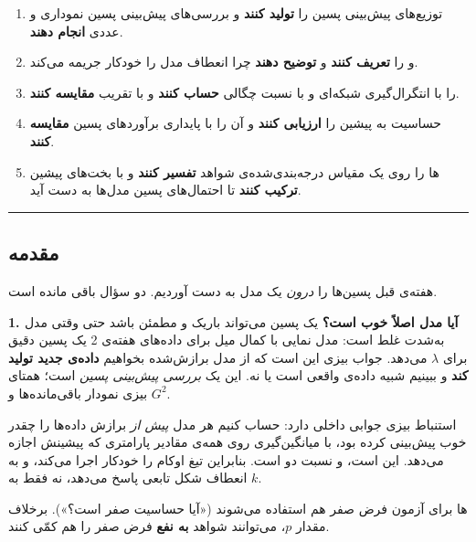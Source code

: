 \begin{enumerate}
\def\labelenumi{\arabic{enumi}.}
\tightlist
\item
  توزیع‌های پیش‌بینی پسین را \textbf{تولید کنند} و بررسی‌های پیش‌بینی پسین
   نموداری و عددی \textbf{انجام دهند}.
\item
   و  را \textbf{تعریف کنند} و
  \textbf{توضیح دهند} چرا  انعطاف مدل را خودکار
  جریمه می‌کند.
\item
   را با انتگرال‌گیری شبکه‌ای و با نسبت چگالی
   \textbf{حساب کنند} و با تقریب 
  \textbf{مقایسه کنند}.
\item
  حساسیت  به پیشین را \textbf{ارزیابی کنند} و آن را با
  پایداری برآوردهای پسین \textbf{مقایسه کنند}.
\item
  ها را روی یک مقیاس درجه‌بندی‌شده‌ی شواهد \textbf{تفسیر
  کنند} و با بخت‌های پیشین \textbf{ترکیب کنند} تا احتمال‌های پسین مدل‌ها به
  دست آید.
\end{enumerate}

\begin{center}\rule{0.5\linewidth}{0.5pt}\end{center}

\subsection{مقدمه}

هفته‌ی قبل پسین‌ها را \emph{درون} یک مدل به دست آوردیم. دو سؤال باقی مانده
است.

\textbf{1. آیا مدل اصلاً خوب است؟} یک پسین می‌تواند باریک و مطمئن باشد حتی
وقتی مدل به‌شدت غلط است: مدل نمایی با کمال میل برای داده‌های هفته‌ی 2 یک
پسین دقیق برای \(\lambda\) می‌دهد. جواب بیزی این است که از مدل برازش‌شده
بخواهیم \textbf{داده‌ی جدید تولید کند} و ببینیم شبیه داده‌ی واقعی است یا
نه. این یک \emph{بررسی پیش‌بینی پسین} 
است؛ همتای بیزی نمودار باقی‌مانده‌ها و \(G^2\).

استنباط بیزی جوابی داخلی دارد: حساب کنیم هر مدل \emph{پیش از} برازش
داده‌ها را چقدر خوب پیش‌بینی کرده بود، با میانگین‌گیری روی همه‌ی مقادیر
پارامتری که پیشینش اجازه می‌دهد. این \textbf{}
است، و نسبت دو  \textbf{} است.
بنابراین  تیغ اوکام را خودکار اجرا می‌کند، و به انعطاف
شکل تابعی پاسخ می‌دهد، نه فقط به \(k\).

ها برای آزمون فرض صفر هم استفاده می‌شوند («آیا حساسیت
صفر است؟»). برخلاف مقدار \(p\)، می‌توانند شواهد \textbf{به نفع} فرض صفر
را هم کمّی کنند.

